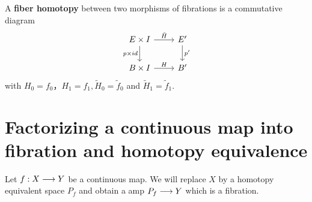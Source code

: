 \documentclass[11pt]{book} %
\begin{document}
\begin{definition}\label{chap6def:fiber_homotpy}
A \textbf{fiber homotopy} between two morphisms of fibrations is a commutative diagram
$$
\begin{tikzcd}
E\times I \arrow[d, "p\times id"'] \arrow[r, "\tilde{H}"] & E' \arrow[d, "p'"] \\
B\times I \arrow[r, "H"] & B'
\end{tikzcd}
$$
with $H_0=f_0， H_1=f_1, \tilde{H}_0=\tilde{f}_0$ and $\tilde{H}_1=\tilde{f}_1$.
\end{definition}
\section*{Factorizing a continuous map into fibration and homotopy equivalence}

Let $f: X\longrightarrow Y$ be a continuous map. We will replace $X$ by a homotopy equivalent space $P_f$ and obtain a amp $P_f\longrightarrow Y$ which is a fibration.
\end{document}
